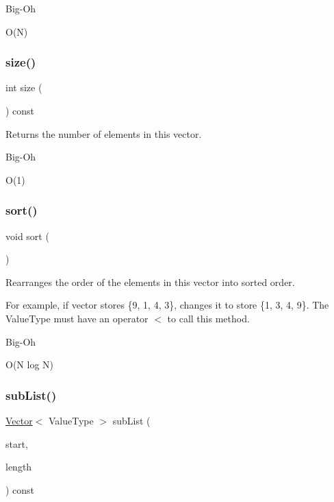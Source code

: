 \begin{DoxyRefDesc}{Big-\/\+Oh}
\item[\mbox{\hyperlink{BigOh__BigOh000133}{Big-\/\+Oh}}]O(\+N) \end{DoxyRefDesc}
\mbox{\label{classVector_af9593d4a5ff4274efaf429cb4f9e57cc}} 
\subsubsection{\texorpdfstring{size()}{size()}}
{\footnotesize\ttfamily int size (\begin{DoxyParamCaption}{ }\end{DoxyParamCaption}) const}



Returns the number of elements in this vector. 

\begin{DoxyRefDesc}{Big-\/\+Oh}
\item[\mbox{\hyperlink{BigOh__BigOh000132}{Big-\/\+Oh}}]O(1) \end{DoxyRefDesc}
\mbox{\label{classVector_a47fdc9eea42b6975cdc835bb2e08810e}} 
\subsubsection{\texorpdfstring{sort()}{sort()}}
{\footnotesize\ttfamily void sort (\begin{DoxyParamCaption}{ }\end{DoxyParamCaption})}



Rearranges the order of the elements in this vector into sorted order. 

For example, if vector stores \{9, 1, 4, 3\}, changes it to store \{1, 3, 4, 9\}. The Value\+Type must have an operator $<$ to call this method. \begin{DoxyRefDesc}{Big-\/\+Oh}
\item[\mbox{\hyperlink{BigOh__BigOh000134}{Big-\/\+Oh}}]O(\+N log N) \end{DoxyRefDesc}
\mbox{\label{classVector_a68d5113d5e35ad7906cb7d1707621e08}} 
\subsubsection{\texorpdfstring{sub\+List()}{subList()}}
{\footnotesize\ttfamily \mbox{\hyperlink{classVector}{Vector}}$<$ Value\+Type $>$ sub\+List (\begin{DoxyParamCaption}\item[{int}]{start,  }\item[{int}]{length }\end{DoxyParamCaption}) const}



